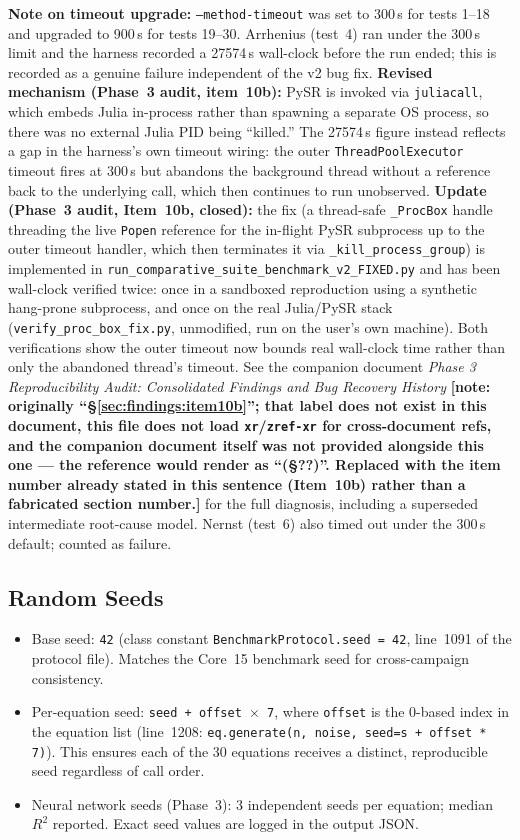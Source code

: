 \documentclass[twoside,11pt]{article}
\begin{document}
\textbf{Note on timeout upgrade:} \texttt{--method-timeout} was set to 300\,s
for tests 1--18 and upgraded to 900\,s for tests 19--30. Arrhenius (test~4)
ran under the 300\,s limit and the harness recorded a 27574\,s wall-clock
before the run ended; this is recorded as a genuine failure independent of
the v2 bug fix. \textbf{Revised mechanism (Phase~3 audit, item~10b):} PySR is
invoked via \texttt{juliacall}, which embeds Julia in-process rather than
spawning a separate OS process, so there was no external Julia PID being
``killed.'' The 27574\,s figure instead reflects a gap in the harness's own
timeout wiring: the outer \texttt{ThreadPoolExecutor} timeout fires at
300\,s but abandons the background thread without a reference back to the
underlying call, which then continues to run unobserved. \textbf{Update
(Phase~3 audit, Item~10b, closed):} the fix (a thread-safe \texttt{\_ProcBox}
handle threading the live \texttt{Popen} reference for the in-flight PySR
subprocess up to the outer timeout handler, which then terminates it via
\texttt{\_kill\_process\_group}) is implemented in
\texttt{run\_comparative\_suite\_benchmark\_v2\_FIXED.py} and has been
wall-clock verified twice: once in a sandboxed reproduction using a
synthetic hang-prone subprocess, and once on the real Julia/PySR stack
(\texttt{verify\_proc\_box\_fix.py}, unmodified, run on the user's own
machine). Both verifications show the outer timeout now bounds real
wall-clock time rather than only the abandoned thread's timeout. See the
companion document \emph{Phase 3 Reproducibility Audit: Consolidated
Findings and Bug Recovery History} \textbf{[note: originally
``\S\ref{sec:findings:item10b}''; that label does not exist in this
document, this file does not load \texttt{xr}/\texttt{zref-xr} for
cross-document refs, and the companion document itself was not provided
alongside this one --- the reference would render as ``(\S??)''. Replaced
with the item number already stated in this sentence (Item~10b) rather
than a fabricated section number.]} for the
full diagnosis, including a superseded intermediate root-cause model.
Nernst (test~6) also timed out under the 300\,s default; counted as failure.

\subsection*{Random Seeds}

\begin{itemize}
  \item Base seed: \texttt{42} (class constant
    \texttt{BenchmarkProtocol.seed = 42}, line~1091 of the protocol file).
    Matches the Core~15 benchmark seed for cross-campaign consistency.
  \item Per-equation seed: \texttt{seed + offset $\times$ 7}, where
    \texttt{offset} is the 0-based index in the equation list
    (line~1208: \texttt{eq.generate(n, noise, seed=s + offset * 7)}).
    This ensures each of the 30 equations receives a distinct, reproducible
    seed regardless of call order.
  \item Neural network seeds (Phase~3): 3 independent seeds per equation;
    median $R^2$ reported. Exact seed values are logged in the output JSON.
\end{itemize}
\end{document}
